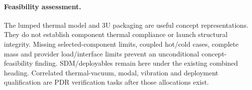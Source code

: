 \paragraph{Feasibility assessment.} The lumped thermal model and 3U packaging are useful concept representations. They do not establish component thermal compliance or launch structural integrity. Missing selected-component limits, coupled hot/cold cases, complete mass and provider load/interface limits prevent an unconditional concept-feasibility finding. SDM/deployables remain here under the existing combined heading. Correlated thermal-vacuum, modal, vibration and deployment qualification are PDR verification tasks after those allocations exist.
